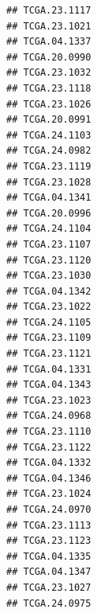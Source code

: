 \documentclass[UTF8]{beamer}\usepackage[]{graphicx}\usepackage[]{color}
\makeatletter
\newenvironment{kframe}{%
 \def\at@end@of@kframe{}%
 \ifinner\ifhmode%
  \def\at@end@of@kframe{\end{minipage}}%
  \begin{minipage}{\columnwidth}%
 \fi\fi%
 \def\FrameCommand##1{\hskip\@totalleftmargin \hskip-\fboxsep
 \colorbox{shadecolor}{##1}\hskip-\fboxsep
     \hskip-\linewidth \hskip-\@totalleftmargin \hskip\columnwidth}%
 \MakeFramed {\advance\hsize-\width
   \@totalleftmargin\z@ \linewidth\hsize
   \@setminipage}}%
 {\par\unskip\endMakeFramed%
 \at@end@of@kframe}
\newenvironment{knitrout}{}{} %
\makeatother
\begin{document}
\begin{frame}[fragile]
\begin{knitrout}
\begin{kframe}
\begin{verbatim}
## TCGA.23.1117                                                    
## TCGA.23.1021                                                    
## TCGA.04.1337                                                    
## TCGA.20.0990                                                    
## TCGA.23.1032                                                    
## TCGA.23.1118                                                    
## TCGA.23.1026                                                    
## TCGA.20.0991                                                    
## TCGA.24.1103                                                    
## TCGA.24.0982                                                    
## TCGA.23.1119                                                    
## TCGA.23.1028                                                    
## TCGA.04.1341                                                    
## TCGA.20.0996                                                    
## TCGA.24.1104                                                    
## TCGA.23.1107                                                    
## TCGA.23.1120                                                    
## TCGA.23.1030                                                    
## TCGA.04.1342                                                    
## TCGA.23.1022                                                    
## TCGA.24.1105                                                    
## TCGA.23.1109                                                    
## TCGA.23.1121                                                    
## TCGA.04.1331                                                    
## TCGA.04.1343                                                    
## TCGA.23.1023                                                    
## TCGA.24.0968                                                    
## TCGA.23.1110                                                    
## TCGA.23.1122                                                    
## TCGA.04.1332                                                    
## TCGA.04.1346                                                    
## TCGA.23.1024                                                    
## TCGA.24.0970                                                    
## TCGA.23.1113                                                    
## TCGA.23.1123                                                    
## TCGA.04.1335                                                    
## TCGA.04.1347                                                    
## TCGA.23.1027                                                    
## TCGA.24.0975                                                    

\end{verbatim}
\end{kframe}
\end{knitrout}
\end{frame}
\end{document}
